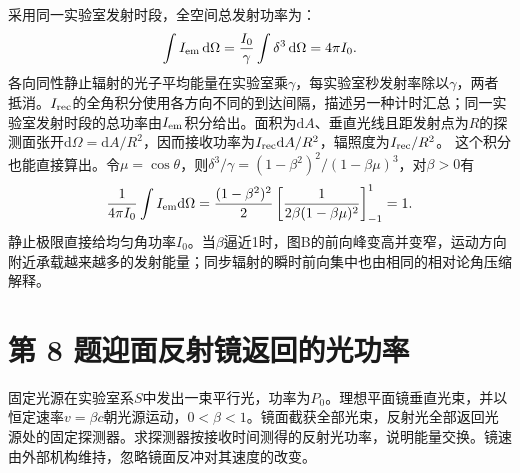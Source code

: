 \documentclass[UTF8,fontset=fandol,a4paper,11pt]{ctexart}
\newcommand{\dd}{\mathop{}\!\mathrm{d}}
\begin{document}
采用同一实验室发射时段，全空间总发射功率为：
\[
\int I_{\rm em}\dd\Omega
=\frac{I_0}{\gamma}\int\delta^3\dd\Omega
=4\pi I_0.
\]
各向同性静止辐射的光子平均能量在实验室乘$\gamma$，每实验室秒发射率除以$\gamma$，两者抵消。$I_{\rm rec}$的全角积分使用各方向不同的到达间隔，描述另一种计时汇总；同一实验室发射时段的总功率由$I_{\rm em}$积分给出。面积为$\mathrm dA$、垂直光线且距发射点为$R$的探测面张开$\mathrm d\Omega=\mathrm dA/R^2$，因而接收功率为$I_{\rm rec}\mathrm dA/R^2$，辐照度为$I_{\rm rec}/R^2$。
这个积分也能直接算出。令$\mu=\cos\theta$，则$\delta^3/\gamma=(1-\beta^2)^2/(1-\beta\mu)^3$，对$\beta>0$有
\[
\frac{1}{4\pi I_0}\int I_{\rm em}\mathrm d\Omega
=\frac{(1-\beta^2)^2}{2}\left[\frac{1}{2\beta(1-\beta\mu)^2}\right]_{-1}^{1}=1.
\]
静止极限直接给均匀角功率$I_0$。当$\beta$逼近1时，图B的前向峰变高并变窄，运动方向附近承载越来越多的发射能量；同步辐射的瞬时前向集中也由相同的相对论角压缩解释。





\section*{第 8 题\quad 迎面反射镜返回的光功率}\label{q:8}

固定光源在实验室系$S$中发出一束平行光，功率为$P_0$。理想平面镜垂直光束，并以恒定速率$v=\beta c$朝光源运动，$0<\beta<1$。镜面截获全部光束，反射光全部返回光源处的固定探测器。求探测器按接收时间测得的反射光功率，说明能量交换。镜速由外部机构维持，忽略镜面反冲对其速度的改变。
\end{document}
